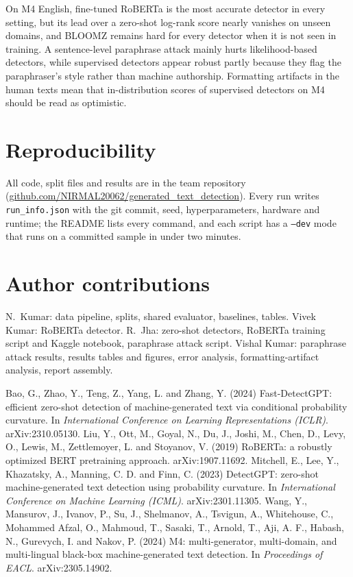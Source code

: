\documentclass{nle}
\begin{document}
On M4 English, fine-tuned RoBERTa is the most accurate detector in every setting, but its lead over a zero-shot
log-rank score nearly vanishes on unseen domains, and BLOOMZ remains hard for every detector when it is not seen in
training. A sentence-level paraphrase attack mainly hurts likelihood-based detectors, while supervised detectors
appear robust partly because they flag the paraphraser's style rather than machine authorship. Formatting artifacts
in the human texts mean that in-distribution scores of supervised detectors on M4 should be read as optimistic.

\section*{Reproducibility}
All code, split files and results are in the team repository
(\url{github.com/NIRMAL20062/generated_text_detection}). Every run writes \texttt{run\_info.json} with the git
commit, seed, hyperparameters, hardware and runtime; the README lists every command, and each script has a
\texttt{--dev} mode that runs on a committed sample in under two minutes.

\section*{Author contributions}
N.\ Kumar: data pipeline, splits, shared evaluator, baselines, tables. Vivek Kumar: RoBERTa detector.
R.\ Jha: zero-shot detectors, RoBERTa training script and Kaggle notebook, paraphrase attack script.
Vishal Kumar: paraphrase attack results, results tables and figures, error analysis, formatting-artifact analysis, report assembly.

\begin{thebibliography}{}
   Bao, G., Zhao, Y., Teng, Z., Yang, L. and Zhang, Y. (2024) Fast-DetectGPT: efficient zero-shot detection of
   machine-generated text via conditional probability curvature. In {\it International Conference on Learning
   Representations (ICLR)}. arXiv:2310.05130.
   Liu, Y., Ott, M., Goyal, N., Du, J., Joshi, M., Chen, D., Levy, O., Lewis, M., Zettlemoyer, L. and Stoyanov, V.
   (2019) RoBERTa: a robustly optimized BERT pretraining approach. arXiv:1907.11692.
   Mitchell, E., Lee, Y., Khazatsky, A., Manning, C. D. and Finn, C. (2023) DetectGPT: zero-shot machine-generated
   text detection using probability curvature. In {\it International Conference on Machine Learning (ICML)}.
   arXiv:2301.11305.
   Wang, Y., Mansurov, J., Ivanov, P., Su, J., Shelmanov, A., Tsvigun, A., Whitehouse, C., Mohammed Afzal, O.,
   Mahmoud, T., Sasaki, T., Arnold, T., Aji, A. F., Habash, N., Gurevych, I. and Nakov, P. (2024) M4:
   multi-generator, multi-domain, and multi-lingual black-box machine-generated text detection. In {\it Proceedings
   of EACL}. arXiv:2305.14902.
\end{thebibliography}

\label{lastpage}
\end{document}
